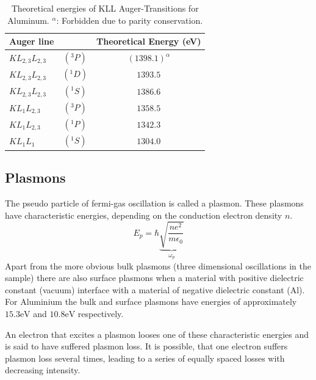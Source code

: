 \documentclass[a4paper]{scrartcl}
\numberwithin{equation}{section}
\numberwithin{figure}{section}
\numberwithin{table}{section}
\begin{document}
%

\begin{table}[!h]
\centering

\begin{tabular}{lcc}
\toprule
Auger line & & Theoretical Energy (eV) \\
\midrule
 $KL_{2,3}L_{2,3}$&$(^3P)$  & $(1398.1)^\alpha$ \\
$ KL_{2,3}L_{2,3}$&$(^1D) $ & $1393.5$ \\
$ KL_{2,3}L_{2,3}$&$(^1S)$ & $1386.6 $ \\
$ KL_{1}L_{2,3}$&$(^3P)$ & $1358.5$ \\
$ KL_{1}L_{2,3}$&$(^1P)$ & $1342.3$ \\
$ KL_{1}L_{1}$&$(^1S)$ & $1304.0$ \\
 \bottomrule

\end{tabular}


\caption{\small Theoretical energies \cite{paper} of KLL Auger-Transitions for Aluminum. $^\alpha$: Forbidden due to parity conservation. }
\label{kll}
\end{table}

\FloatBarrier

\subsection{Plasmons}
The pseudo particle of fermi-gas oscillation is called a plasmon. These plasmons have characteristic energies, depending on the conduction electron density $n$. 
$$E_p = \hbar \underbrace{\sqrt{\frac{ne^2}{m\epsilon_0}}}_{\omega_p}$$
Apart from the more obvious bulk plasmons (three dimensional oscillations in the sample) there are also surface plasmons when a material with positive dielectric constant (vacuum) interface with a material of negative dielectric constant (Al). For Aluminium the bulk and surface plasmons have energies of approximately $15.3 \text{eV}$ and $10.8 \text{eV}$ respectively.

An electron that excites a plasmon looses one of these characteristic energies and is said to have suffered plasmon loss. It is possible, that one electron suffers plasmon loss several times, leading to a series of equally spaced losses with decreasing intensity.
\end{document}
